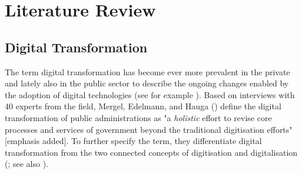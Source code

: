 \section{Literature Review}\label{Literature Review}
\subsection{Digital Transformation}\label{Digital Transformation}
The term digital transformation has become ever more prevalent in the private and lately also in the public sector to describe the ongoing changes enabled by the adoption of digital technologies (see for example \cite{McKinsey2018,BehordenSpiegel2020,Tabrizi2019}). Based on interviews with 40 experts from the field, Mergel, Edelmann, and Hauga (\cite*[p. 12]{Mergel2019a}) define the digital transformation of public administrations as "a \textit{holistic} effort to revise core processes and services of government beyond the traditional digitisation efforts" [emphasis added]. To further specify the term, they differentiate digital transformation from the two connected concepts of digitisation and digitalisation (\cite{Mergel2019a}; see also \cite{Bloomberg2018, Brennen2015}).\par 

